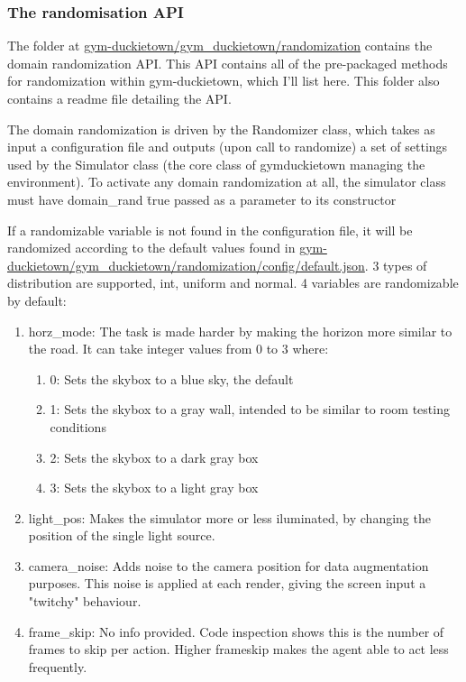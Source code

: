 \documentclass[12pt]{article}
\begin{document}
\subsubsection{The randomisation API}
The folder at \url{gym-duckietown/gym_duckietown/randomization} contains the domain randomization API. This API contains all of the pre-packaged methods for randomization within gym-duckietown, which I’ll list here. This folder also contains a readme file detailing the API.

The domain randomization is driven by the Randomizer class, which takes as input a configuration file and outputs (upon call to randomize) a set of settings used by the Simulator class (the core class of gym\-duckietown managing the environment). To activate any domain randomization at all, the simulator class must have domain\_rand \= true passed as a parameter to its constructor

If a randomizable variable is not found in the configuration file, it will be randomized according to the default values found in \url{gym-duckietown/gym_duckietown/randomization/config/default.json}. 3 types of distribution are supported, int, uniform and normal. 4 variables are randomizable by default:
\begin{enumerate}
    \item horz\_mode: The task is made harder by making the horizon more similar to the road. It can take integer values from 0 to 3 where:
    \begin{enumerate}
        \item 0: Sets the skybox to a blue sky, the default
        \item 1: Sets the skybox to a gray wall, intended to be similar to room testing conditions
        \item 2: Sets the skybox to a dark gray box
        \item 3: Sets the skybox to a light gray box
    \end{enumerate}
    \item light\_pos: Makes the simulator more or less iluminated, by changing the position of the single light source.
    \item camera\_noise: Adds noise to the camera position for data augmentation purposes. This noise is applied at each render, giving the screen input a "twitchy" behaviour.
    \item frame\_skip: No info provided. Code inspection shows this is the number of frames to skip per action. Higher frameskip makes the agent able to act less frequently.
\end{enumerate}
\end{document}
